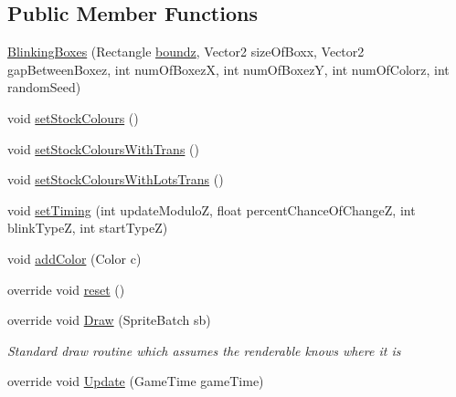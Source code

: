 \subsection*{Public Member Functions}
\begin{DoxyCompactItemize}
\item 
\mbox{\hyperlink{class_r_c___framework_1_1_blinking_boxes_a16ee508e4fa77310bb4305a16a199e95}{Blinking\+Boxes}} (Rectangle \mbox{\hyperlink{class_r_c___framework_1_1_r_c___renderable_bounded_aabcb0f8cd56a2e7b6209f8530194aff1}{boundz}}, Vector2 size\+Of\+Boxx, Vector2 gap\+Between\+Boxez, int num\+Of\+BoxezX, int num\+Of\+BoxezY, int num\+Of\+Colorz, int random\+Seed)
\item 
void \mbox{\hyperlink{class_r_c___framework_1_1_blinking_boxes_a1037bf0c922befbecbdca455d7f6165b}{set\+Stock\+Colours}} ()
\item 
void \mbox{\hyperlink{class_r_c___framework_1_1_blinking_boxes_a2166422cce34c57fb9d77627699c74eb}{set\+Stock\+Colours\+With\+Trans}} ()
\item 
void \mbox{\hyperlink{class_r_c___framework_1_1_blinking_boxes_a6435042084daac78ccd87d801d6a397d}{set\+Stock\+Colours\+With\+Lots\+Trans}} ()
\item 
void \mbox{\hyperlink{class_r_c___framework_1_1_blinking_boxes_ac28bc5c94fe42c132b822745ef292e46}{set\+Timing}} (int update\+ModuloZ, float percent\+Chance\+Of\+ChangeZ, int blink\+TypeZ, int start\+TypeZ)
\item 
void \mbox{\hyperlink{class_r_c___framework_1_1_blinking_boxes_a5e2d89da8ee707087bd2f6035b9bbcb8}{add\+Color}} (Color c)
\item 
override void \mbox{\hyperlink{class_r_c___framework_1_1_blinking_boxes_a2120dce99476eb2e086063a004acfd90}{reset}} ()
\item 
override void \mbox{\hyperlink{class_r_c___framework_1_1_blinking_boxes_a4e8a5e543c03905582bb27a0acfaa6cd}{Draw}} (Sprite\+Batch sb)
\begin{DoxyCompactList}\small\item\em Standard draw routine which assumes the renderable knows where it is \end{DoxyCompactList}\item 
override void \mbox{\hyperlink{class_r_c___framework_1_1_blinking_boxes_ac168957c1b1d674b9449bc53b07cf704}{Update}} (Game\+Time game\+Time)
\end{DoxyCompactItemize}
